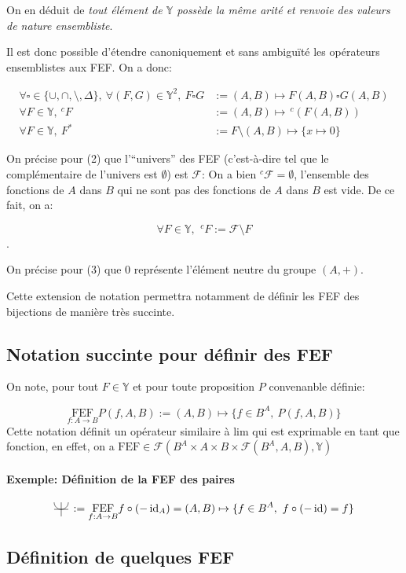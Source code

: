 \documentclass{article}
\newcommand{\Y}{{\mathbb Y}}
\newcommand{\FEF}[1]{\underset{f:A\to B}{\text{FEF}}#1}
\newcommand{\cF}{{\mathcal F}}
\newcommand{\id}{\operatorname{id}}
\newcommand{\evenfunctions}{%
	\begin{tikzpicture}[scale=1.5, baseline=-0.5ex]%
		\draw (-1ex,0) -- (1ex,0);%
		\draw (0,-1ex) -- (0, 1ex);%
		\draw (0ex, 0ex) arc (-90:0:1ex);%
		\draw (0ex, 0ex) arc (90:0:-1ex);%
	\end{tikzpicture}\,%
}
\begin{document}
On en déduit de \emph{tout élément de $\Y$ possède la même arité et renvoie des valeurs de nature ensembliste}.

Il est donc possible d'étendre canoniquement et sans ambiguïté les opérateurs ensemblistes aux FEF.
On a donc:

\begin{align}
	\forall \square \in \{\cup, \cap, \setminus, \Delta \},\ \forall (F, G) \in \Y^2,\ F \square G &:= (A, B)\mapsto F(A, B) \square G(A, B) \\
	\forall F\in \Y,\ ^c\!F &:= (A, B)\mapsto \,^c\!(F(A,B)) \\
	\forall F \in \Y,\ F^\ast &:= F \setminus (A, B)\mapsto \{x\mapsto 0\} 
\end{align}

On précise pour (2) que l'“univers” des FEF (c'est-à-dire tel que le complémentaire de l'univers est $\emptyset$) est $\cF$: On a bien $^c\!\cF = \emptyset$, l'ensemble des fonctions de $A$ dans $B$ qui ne sont pas des fonctions de $A$ dans $B$ est vide. De ce fait, on a:

\[
	\forall F\in \Y,\ \,^c\!F := \cF \setminus F
\]. 

On précise pour (3) que 0 représente l'élément neutre du groupe $(A, +)$.

Cette extension de notation permettra notamment de définir les FEF des bijections de manière très succinte.

\subsection{Notation succinte pour définir des FEF}

On note, pour tout $F \in \Y$ et pour toute proposition $P$ convenanble définie:

\[
	\FEF{P(f, A, B)} := (A, B) \mapsto \{f\in B^A,\ P(f, A, B)\} 
\]
Cette notation définit un opérateur similaire à $\text{lim}$ qui est exprimable en tant que fonction, en effet, on a $\text{FEF} \in \cF(B^A \times A \times B \times \cF(B^A, A, B), \Y)$

\paragraph{Exemple: Définition de la FEF des paires}

\[
	\evenfunctions := \FEF{f\circ (-\id_A)} = (A, B) \mapsto \{f\in B^A,\ f \circ (-\id) = f \} 
\] 

\subsection{Définition de quelques FEF}
\end{document}
